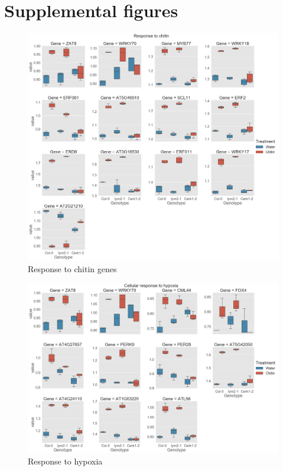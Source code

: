 \documentclass[../main.tex]{subfiles}
\begin{document}
\appendix

\chapter{Supplemental figures}
\label{cha:supplfig}

\begin{figure}[ht]
  \centering
  \includegraphics[width=\textwidth, height=\textheight, keepaspectratio]{figures/response to chitin.png}
  \caption{\label{fig:respchitin} Response to chitin genes}
\end{figure}


\begin{figure}[ht]
  \centering
  \includegraphics[width=\textwidth, height=\textheight, keepaspectratio]{figures/cellular response to hypoxia.png}
  \caption{\label{fig:resphypoxia} Response to hypoxia}
\end{figure}
\end{document}
